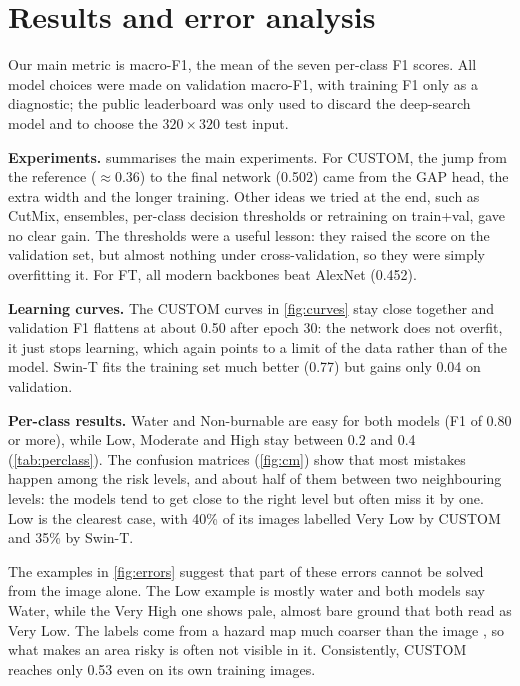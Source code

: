 \section{Results and error analysis}\label{sec:results}

Our main metric is macro-F1, the mean of the seven per-class F1 scores. All model choices were made on validation macro-F1, with training F1 only as a diagnostic; the public leaderboard was only used to discard the deep-search model and to choose the $320\times320$ test input.

\textbf{Experiments.}  summarises the main experiments. For CUSTOM, the jump from the reference ($\approx$0.36) to the final network (0.502) came from the GAP head, the extra width and the longer training. Other ideas we tried at the end, such as CutMix, ensembles, per-class decision thresholds or retraining on train+val, gave no clear gain. The thresholds were a useful lesson: they raised the score on the validation set, but almost nothing under cross-validation, so they were simply overfitting it. For FT, all modern backbones beat AlexNet (0.452).

\textbf{Learning curves.} The CUSTOM curves in \cref{fig:curves} stay close together and validation F1 flattens at about 0.50 after epoch 30: the network does not overfit, it just stops learning, which again points to a limit of the data rather than of the model. Swin-T fits the training set much better (0.77) but gains only 0.04 on validation.

\textbf{Per-class results.} Water and Non-burnable are easy for both models (F1 of 0.80 or more), while Low, Moderate and High stay between 0.2 and 0.4 (\cref{tab:perclass}). The confusion matrices (\cref{fig:cm}) show that most mistakes happen among the risk levels, and about half of them between two neighbouring levels: the models tend to get close to the right level but often miss it by one. Low is the clearest case, with 40\% of its images labelled Very Low by CUSTOM and 35\% by Swin-T.

The examples in \cref{fig:errors} suggest that part of these errors cannot be solved from the image alone. The Low example is mostly water and both models say Water, while the Very High one shows pale, almost bare ground that both read as Very Low. The labels come from a hazard map much coarser than the image \citep{shen2023firerisk}, so what makes an area risky is often not visible in it. Consistently, CUSTOM reaches only 0.53 even on its own training images.

